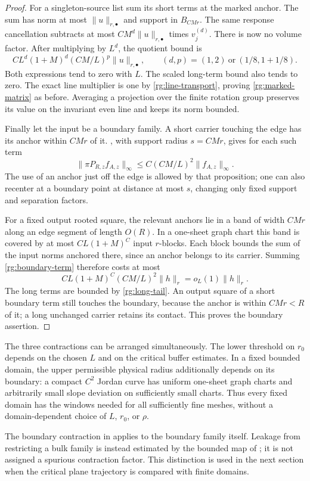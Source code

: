 \begin{proof}
For a singleton-source list sum its short terms at the marked anchor.
The sum has norm at most $\|u\|_{r,\bullet}$ and support in $B_{CMr}$.
The same response cancellation subtracts at most
$CM^d\|u\|_{r,\bullet}$ times $v_j^{(d)}$.  There is now no volume
factor.  After multiplying by $L^d$, the quotient bound is
\begin{equation}
 C L^d(1+M)^d(CM/L)^p\|u\|_{r,\bullet},
 \qquad
 (d,p)=(1,2)\ \text{or}\ (1/8,1+1/8).
 \label{rg:marked-quotient}
\end{equation}
Both expressions tend to zero with $L$.  The scaled long-term bound
also tends to zero.  The exact line multiplier is one by
\eqref{rg:line-transport}, proving \eqref{rg:marked-matrix} as before.
Averaging a projection over the finite rotation group preserves its
value on the invariant even line and keeps its norm bounded.

Finally let the input be a boundary family.  A short carrier touching
the edge has its anchor within $CMr$ of it.  , with
support radius $s=CMr$, gives for each such term
\begin{equation}
 \|\pi P_{R,z}f_{A,z}\|_\infty
       \le C(CM/L)^2\|f_{A,z}\|_\infty.
 \label{rg:boundary-term}
\end{equation}
The use of an anchor just off the edge is allowed by that proposition;
one can also recenter at a boundary point at distance at most $s$,
changing only fixed support and separation factors.

For a fixed output rooted square, the relevant anchors lie in a band of
width $CMr$ along an edge segment of length $O(R)$.  In a one-sheet
graph chart this band is covered by at most $CL(1+M)^C$ input
$r$-blocks.  Each block bounds the sum of the input norms anchored
there, since an anchor belongs to its carrier.  Summing
\eqref{rg:boundary-term} therefore costs at most
\[
 CL(1+M)^C(CM/L)^2\|h\|_r=o_L(1)\|h\|_r.
\]
The long terms are bounded by \eqref{rg:long-tail}.  An output square of
a short boundary term still touches the boundary, because the anchor
is within $CMr<R$ of it; a long unchanged carrier retains its contact.
This proves the boundary assertion.
\end{proof}

The three contractions can be arranged simultaneously.  The lower
threshold on $r_0$ depends on the chosen $L$ and on the critical buffer
estimates.  In a fixed bounded domain, the upper permissible physical
radius additionally depends on its boundary: a compact $C^2$ Jordan
curve has uniform one-sheet graph charts and arbitrarily small slope
deviation on sufficiently small charts.  Thus every fixed domain has
the windows needed for all sufficiently fine meshes, without a
domain-dependent choice of $L$, $r_0$, or $\rho$.

The boundary contraction in  applies to the boundary
family itself.  Leakage from restricting a bulk family is instead
estimated by the bounded map of ; it is not assigned a
spurious contraction factor.  This distinction is used in the next
section when the critical plane trajectory is compared with finite
domains.
